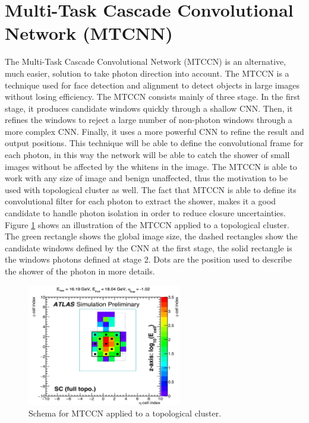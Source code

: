 \section{Multi-Task Cascade Convolutional Network (MTCNN)}

The Multi-Task Cascade Convolutional Network (MTCCN) is an alternative, much easier, solution to take photon direction into account. The MTCCN is a technique used for face detection and alignment to detect objects in large images without losing efficiency. The MTCCN consists mainly of three stage. In the first stage, it produces candidate windows quickly through a shallow CNN. Then,  it  refines the windows to reject a large number of non-photon windows through a more complex CNN. Finally, it uses a more powerful CNN to refine the result and output positions. This technique will be able to define the convolutional frame for each photon, in this way the network will be able to catch the shower of small images without be affected by the whitens in the image. The MTCCN is able to work with any size of image and benign unaffected, thus the motivation to be used with topological cluster as well. The fact that MTCCN is able to define its convolutional filter for each photon to extract the shower, makes it a good candidate to handle photon isolation in order to reduce closure uncertainties. Figure \ref{fig:Adx3:MTCCN} shows an illustration of the MTCCN applied to a topological cluster. The green rectangle shows the global image size, the dashed rectangles show the candidate windows defined by the CNN at the first stage, the solid rectangle is the windows photons defined at stage 2. Dots are the position used to describe the shower of the photon in more details. 
\begin{figure}[htbp]
    \centering
    \includegraphics[width=0.6\textwidth]{Adx/Adx3/Img/MTCCN.png}
    \caption{Schema for MTCCN applied to a topological cluster.}
    \label{fig:Adx3:MTCCN}
\end{figure}

